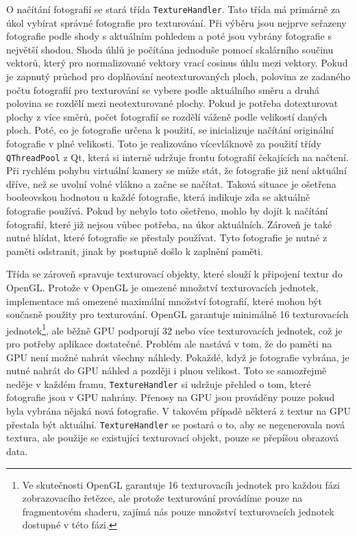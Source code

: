 \documentclass[11pt,twoside,a4paper]{book}
\begin{document}
O načítání fotografií se stará třída \texttt{TextureHandler}. Tato třída má primárně za úkol vybírat správné fotografie pro texturování. Při výběru jsou nejprve seřazeny fotografie podle shody s aktuálním pohledem a poté jsou vybrány fotografie s největší shodou. Shoda úhlů je počítána jednoduše pomocí skalárního součinu vektorů, který pro normalizované vektory vrací cosinus úhlu mezi vektory. Pokud je zapnutý průchod pro doplňování neotexturovaných ploch, polovina ze zadaného počtu fotografií pro texturování se vybere podle aktuálního směru a druhá polovina se rozdělí mezi neotexturované plochy. Pokud je potřeba dotexturovat plochy z více směrů, počet fotografií se rozdělí váženě podle velikostí daných ploch. Poté, co je fotografie určena k použití, se inicializuje načítání originální fotografie v plné velikosti. Toto je realizováno vícevláknově za použití třídy \texttt{QThreadPool} z Qt, která si interně udržuje frontu fotografií čekajících na načtení.  Při rychlém pohybu virtuální kamery se může stát, že fotografie již není aktuální dříve, než se uvolní volné vlákno a začne se načítat. Taková situace je ošetřena booleovskou hodnotou u každé fotografie, která indikuje zda se aktuálně fotografie používá. Pokud by nebylo toto ošetřeno, mohlo by dojít k načítání fotografií, které již nejsou vůbec potřeba, na úkor aktuálních. Zároveň je také nutné hlídat, které fotografie se přestaly používat. Tyto fotografie je nutné z paměti odstranit, jinak by postupně došlo k zaplnění paměti.

Třída se zároveň spravuje texturovací objekty, které slouží k připojení textur do OpenGL. Protože v OpenGL je omezené množství texturovacích jednotek, implementace má omezené maximální množství fotografií, které mohou být současně použity pro texturování. OpenGL garantuje minimálně 16 texturovacích jednotek\footnote{Ve skutečnosti OpenGL garantuje 16 texturovacíh jednotek pro každou fázi zobrazovacího řetězce, ale protože texturování provádíme pouze na fragmentovém shaderu, zajímá nás pouze množství texturovacích jednotek dostupné v této fázi.}, ale běžně GPU podporují 32 nebo více texturovacích jednotek, což je pro potřeby aplikace dostatečné. Problém ale nastává v tom, že do paměti na GPU není možné nahrát všechny náhledy. Pokaždé, když je fotografie vybrána, je nutné nahrát do GPU náhled a později i plnou velikost. Toto se samozřejmě neděje v každém framu, \texttt{TextureHandler} si udržuje přehled o tom, které fotografie jsou v GPU nahrány. Přenosy na GPU jsou prováděny pouze pokud byla vybrána nějaká nová fotografie. V takovém případě některá z textur na GPU přestala být aktuální.  \texttt{TextureHandler} se postará o to, aby se negenerovala nová textura, ale použije se existující texturovací objekt, pouze se přepíšou obrazová data. 
\end{document}
